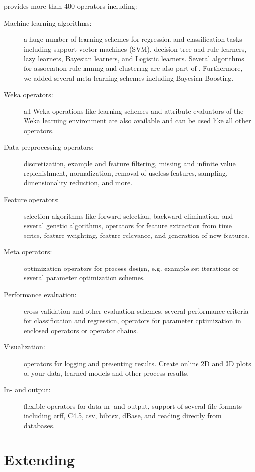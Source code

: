 \rapidminer provides more than 400 operators including:
\begin{description}
\item[Machine learning algorithms:] a huge number of learning schemes for
  regression and classification tasks including support vector machines (SVM),
  decision tree and rule learners, lazy learners, Bayesian learners, and
  Logistic learners. Several algorithms for association rule mining and
  clustering are also part of \rapidminer. Furthermore, we added several meta
  learning schemes including Bayesian Boosting.
\item[Weka operators:] all Weka operations like learning schemes and attribute
  evaluators of the Weka learning environment are also available and can be
  used like all other \rapidminer operators.
\item[Data preprocessing operators:] discretization, example and feature filtering,
  missing and infinite value replenishment, normalization, removal of useless
  features, sampling, dimensionality reduction, and more.
\item[Feature operators:] selection algorithms like forward selection,
  backward elimination, and several genetic algorithms, operators for feature
  extraction from time series, feature weighting, feature relevance, and
  generation of new features.
\item[Meta operators:] optimization operators for process design,
  e.g. example set iterations or several parameter optimization schemes.
\item[Performance evaluation:] cross-validation and other evaluation schemes,
  several performance criteria for classification and regression, operators
  for parameter optimization in enclosed operators or operator chains.
\item[Visualization:] operators for logging and presenting results. Create
  online 2D and 3D plots of your data, learned models and other process
  results.
\item[In- and output:] flexible operators for data in- and output, support of
several file formats including arff, C4.5, csv, bibtex, dBase, and reading
directly from databases.
\end{description}




\section{Extending \rapidminer}

